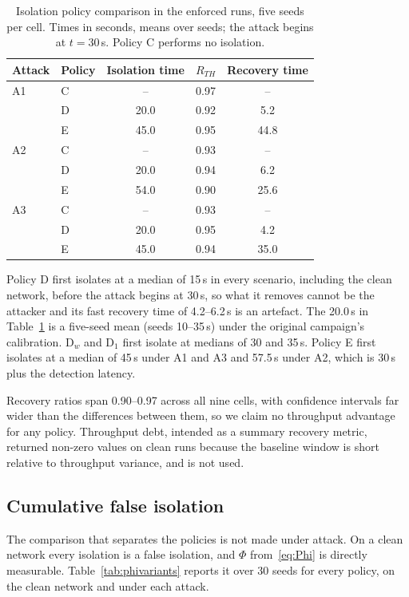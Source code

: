 \documentclass[pdflatex,sn-mathphys-num]{sn-jnl}%
\theoremstyle{thmstyleone}%
\theoremstyle{thmstyletwo}%
\theoremstyle{thmstylethree}%
\begin{document}
\begin{table}[!t]
\caption{Isolation policy comparison in the enforced runs, five seeds per cell.
Times in seconds, means over seeds; the attack begins at $t = 30$\,s. Policy C performs no
isolation.}
\label{tab:policy}
\centering
\footnotesize
\begin{tabular}{@{}llccc@{}}
\toprule
Attack & Policy & Isolation time & $R_{TH}$ & Recovery time \\
\midrule
A1 & C & -- & 0.97 & -- \\
   & D & 20.0 & 0.92 & 5.2 \\
   & E & 45.0 & 0.95 & 44.8 \\
A2 & C & -- & 0.93 & -- \\
   & D & 20.0 & 0.94 & 6.2 \\
   & E & 54.0 & 0.90 & 25.6 \\
A3 & C & -- & 0.93 & -- \\
   & D & 20.0 & 0.95 & 4.2 \\
   & E & 45.0 & 0.94 & 35.0 \\
\bottomrule
\end{tabular}
\end{table}

Policy D first isolates at a median of 15\,s in every scenario, including the
clean network, before the attack begins at 30\,s, so what it removes cannot be
the attacker and its fast recovery time of 4.2--6.2\,s is an artefact. The
20.0\,s in Table~\ref{tab:policy} is a five-seed mean (seeds 10--35\,s) under
the original campaign's calibration. D$_w$ and D$_1$ first isolate at medians
of 30 and 35\,s. Policy E first isolates at a median of 45\,s under A1 and A3
and 57.5\,s under A2, which is 30\,s plus the detection latency.

Recovery ratios span 0.90--0.97 across all nine cells, with confidence
intervals far wider than the differences between them, so we claim no
throughput advantage for any policy. Throughput debt, intended as a summary
recovery metric, returned non-zero values on clean runs because the baseline
window is short relative to throughput variance, and is not used.

\subsection{Cumulative false isolation}
\label{sec:phi}

The comparison that separates the policies is not made under attack. On a clean
network every isolation is a false isolation, and $\Phi$ from~\eqref{eq:Phi} is
directly measurable. Table~\ref{tab:phivariants} reports
it over 30 seeds for every policy, on the clean network and under each attack.
\end{document}
